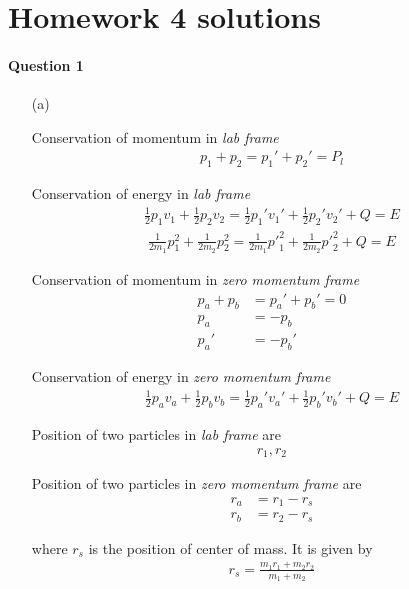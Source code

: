 \documentclass[11pt,a4paper]{article}
\author{Zehao Gao}
\begin{document}
\section*{Homework 4 solutions}

\paragraph{Question 1}

\begin{enumerate}

\item[(a)]

Conservation of momentum in \textit{lab frame}
\begin{align}
p_1+p_2=p_1'+p_2'=P_l
\end{align}

Conservation of energy in \textit{lab frame}
\begin{align}
\frac{1}{2}p_1v_1+\frac{1}{2}p_2v_2=\frac{1}{2}p_1'v_1'+\frac{1}{2}p_2'v_2'+Q=E
\end{align}
\begin{align}
\frac{1}{2m_1}p_1^2+\frac{1}{2m_2}p_2^2=\frac{1}{2m_1}{p'}_1^2+\frac{1}{2m_2}{p'}_2^2+Q=E
\end{align}

Conservation of momentum in \textit{zero momentum frame}
\begin{align}
p_a+p_b&=p_a'+p_b'=0 \\
p_a&=-p_b \\
p_a'&=-p_b'
\end{align}

Conservation of energy in \textit{zero momentum frame}
\begin{align}
\frac{1}{2}p_av_a+\frac{1}{2}p_bv_b=\frac{1}{2}p_a'v_a'+\frac{1}{2}p_b'v_b'+Q=E
\end{align}

Position of two particles in \textit{lab frame} are
\begin{align}
r_1,r_2
\end{align}

Position of two particles in \textit{zero momentum frame} are
\begin{align}
r_a&=r_1-r_s \\
r_b&=r_2-r_s
\end{align}

where $r_s$ is the position of center of mass. It is given by
\begin{align}
r_s=\frac{m_1r_1+m_2r_2}{m_1+m_2}
\end{align}


\end{enumerate}
\end{document}
